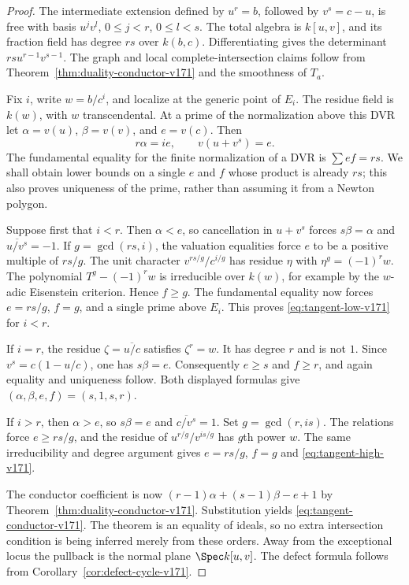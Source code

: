 \begin{proof}
The intermediate extension defined by $u^r=b$, followed by
$v^s=c-u$, is free with basis $u^jv^l$, $0\leq j<r$, $0\leq l<s$.
The total algebra is $k[u,v]$, and its fraction field has degree $rs$
over $k(b,c)$. Differentiating gives the determinant
$rsu^{r-1}v^{s-1}$. The graph and local complete-intersection claims
follow from Theorem~\ref{thm:duality-conductor-v171} and the smoothness
of $T_a$.

Fix $i$, write $w=b/c^i$, and localize at the generic point of $E_i$.
The residue field is $k(w)$, with $w$ transcendental. At a prime of the
normalization above this DVR let $\alpha=v(u)$, $\beta=v(v)$, and
$e=v(c)$. Then
\begin{equation}\label{eq:tangent-valuation-relations-v171}
 r\alpha=ie,\qquad v(u+v^s)=e.
\end{equation}
The fundamental equality for the finite normalization of a DVR is
$\sum ef=rs$. We shall obtain lower bounds on a single $e$ and $f$
whose product is already $rs$; this also proves uniqueness of the
prime, rather than assuming it from a Newton polygon.

Suppose first that $i<r$. Then $\alpha<e$, so cancellation in $u+v^s$
forces $s\beta=\alpha$ and $\overline{u/v^s}=-1$. If $g=\gcd(rs,i)$,
the valuation equalities force $e$ to be a positive multiple of $rs/g$.
The unit character $v^{rs/g}/c^{i/g}$ has residue $\eta$ with
$\eta^g=(-1)^r w$. The polynomial $T^g-(-1)^r w$ is irreducible over
$k(w)$, for example by the $w$-adic Eisenstein criterion. Hence $f\geq g$.
The fundamental equality now forces $e=rs/g$, $f=g$, and a single
prime above $E_i$. This proves \eqref{eq:tangent-low-v171} for $i<r$.

If $i=r$, the residue $\zeta=\overline{u/c}$ satisfies $\zeta^r=w$.
It has degree $r$ and is not $1$. Since
$v^s=c(1-u/c)$, one has $s\beta=e$. Consequently $e\geq s$ and
$f\geq r$, and again equality and uniqueness follow. Both displayed
formulas give $(\alpha,\beta,e,f)=(s,1,s,r)$.

If $i>r$, then $\alpha>e$, so $s\beta=e$ and
$\overline{c/v^s}=1$. Set $g=\gcd(r,is)$. The relations force
$e\geq rs/g$, and the residue of $u^{r/g}/v^{is/g}$ has $g$th power
$w$. The same irreducibility and degree argument gives
$e=rs/g$, $f=g$ and \eqref{eq:tangent-high-v171}.

The conductor coefficient is now
$(r-1)\alpha+(s-1)\beta-e+1$ by
Theorem~\ref{thm:duality-conductor-v171}. Substitution yields
\eqref{eq:tangent-conductor-v171}. The theorem is an equality of ideals,
so no extra intersection condition is being inferred merely from
these orders. Away from the exceptional locus the pullback is the
normal plane $\Spec k[u,v]$. The defect formula follows from
Corollary~\ref{cor:defect-cycle-v171}.
\end{proof}

